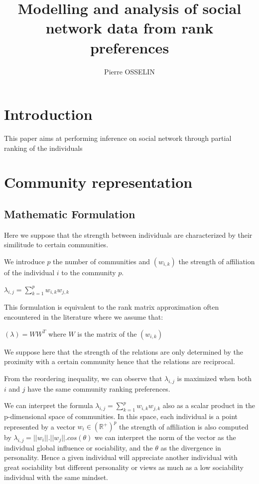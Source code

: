 \documentclass[12pt]{ociamthesis}  %
\title{Modelling and analysis of social network data from rank preferences     %
	}   %
\author{Pierre OSSELIN}             %
\begin{document}
	
	
	\maketitle                  %
	
	
	
	\chapter{Introduction}
	This paper aims at performing inference on social network through partial ranking of the individuals
	
	
	\chapter{Community representation}
	\section{Mathematic Formulation}
	Here we suppose that the strength between individuals are characterized by their similitude to certain communities.
	
	We introduce $p$ the number of communities and $(w_{i,k})$ the strength of affiliation of the individual $i$ to the community $p$.
	
	$\lambda_{i,j} = \sum_{k = 1}^{p} w_{i,k} w_{j,k}$
	
	This formulation is equivalent to the rank matrix approximation often encountered in the literature where we assume that:
	
	$(\lambda) = WW^{T}$ where $W$ is the matrix of the $(w_{i,k})$
	
	We suppose here that the strength of the relations are only determined by the proximity with a certain community hence that the relations are reciprocal.
	
	From the reordering inequality, we can observe that $\lambda_{i,j}$ is maximized when both $i$ and $j$ have the same community ranking preferences.
	
	We can interpret the formula $\lambda_{i,j} = \sum_{k = 1}^{p} w_{i,k} w_{j,k}$ also as a scalar product in the p-dimensional space of communities. In this space, each individual is a point represented by a vector $w_{i} \in (\mathbb{R}^{+})^{p} $ the strength of affiliation is also computed by $\lambda_{i,j} = ||w_{i}||.||w_{j}||.cos(\theta)$ we can interpret the norm of the vector as the individual global influence or sociability, and the $\theta$ as the divergence in personality. Hence a given individual will appreciate another individual with great sociability but different personality or views as much as a low sociability individual with the same mindset.
	
\end{document}
